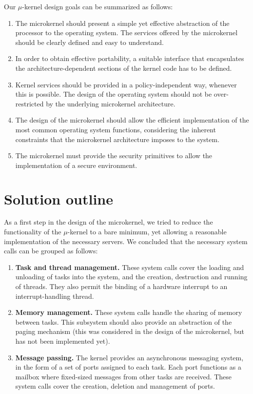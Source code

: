 \documentclass[12pt, letterpaper, oneside, english]{article}
\begin{document}
Our $\mu$-kernel design goals can be summarized as follows:

\begin{enumerate}
\item[] The microkernel should present a simple yet effective abstraction of the processor to the operating system. The services offered by the microkernel should be clearly defined and easy to understand.
\item[] In order to obtain effective portability, a suitable interface that encapsulates the architecture-dependent sections of the kernel code has to be defined.
\item[] Kernel services should be provided in a policy-independent way, whenever this is possible. The design of the operating system should not be over-restricted by the underlying microkernel architecture.
\item[] The design of the microkernel should allow the efficient implementation of the most common operating system functions, considering the inherent constraints that the microkernel architecture imposes to the system.
\item[] The microkernel must provide the security primitives to allow the implementation of a secure environment.
\end{enumerate}

\section{Solution outline}

As a first step in the design of the microkernel, we tried to reduce the functionality of the $\mu$-kernel to a bare minimum, yet allowing a reasonable implementation of the necessary servers. We concluded that the necessary system calls can be grouped as follows:

\begin{enumerate}
\item[]\textbf{Task and thread management.} These system calls cover the loading and unloading of tasks into the system, and the creation, destruction and running of threads. They also permit the binding of a hardware interrupt to an interrupt-handling thread.
\item[]\textbf{Memory management.} These system calls handle the sharing of memory between tasks. This subsystem should also provide an abstraction of the paging mechanism (this was considered in the design of the microkernel, but has not been implemented yet).
\item[]\textbf{Message passing.} The kernel provides an asynchronous messaging system, in the form of a set of ports assigned to each task. Each port functions as a mailbox where fixed-sized messages from other tasks are received. These system calls cover the creation, deletion and management of ports.
\end{enumerate} 
\end{document}
